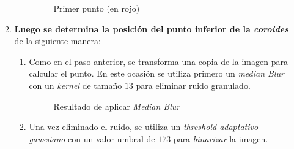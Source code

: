 \begin{enumerate}
\begin{enumerate}[label*=\arabic*.]
\begin{enumerate}[label*=\arabic*.]
      \begin{figure}[H]
        \caption{Primer punto (en rojo)}
        \centering \setlength\fboxsep{0pt} \setlength\fboxrule{0.5pt}
      \end{figure}

    \end{enumerate}
  \item \textbf{Luego se determina la posición del punto inferior de
      la \emph{\gls{coroides}}} de la siguiente manera:
    \begin{enumerate}[label*=\arabic*.]
    \item Como en el paso anterior, se transforma una copia de la
      imagen para calcular el punto. En este ocasión se utiliza
      primero un \emph{median Blur} con un \emph{kernel} de tamaño
      $13$ para eliminar ruido granulado.

      \begin{figure}[H]
        \caption{Resultado de aplicar \emph{Median Blur}}
        \centering \setlength\fboxsep{0pt} \setlength\fboxrule{0.5pt}
      \end{figure}

    \item Una vez eliminado el ruido, se utiliza un \emph{threshold
        adaptativo
        gaussiano} con
      un valor umbral de $173$ para \emph{binarizar} la imagen.


\end{enumerate}
\end{enumerate}
\end{enumerate}
